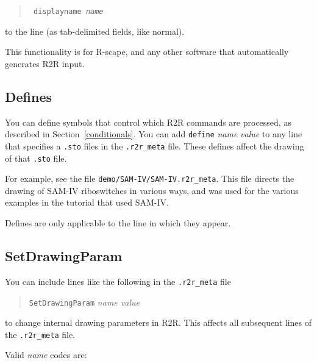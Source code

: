 \documentclass[letterpaper,12pt]{report}
\newcommand{\example}[1]{
\begin{quote}
{\raggedright
#1
}
\end{quote}
}
\newcommand{\examplett}[1]{
\example{{\tt #1}}
}
\begin{document}
\examplett{
  {\tt displayname} {\it name}
}

to the line (as tab-delimited fields, like normal).

This functionality is for R-scape, and any other software that automatically generates R2R input.

\subsection{Defines}

You can define symbols that control which R2R commands are processed, as described in Section~\ref{conditionals}.
You can add {\tt define} {\it name} {\it value} to any line that specifies a {\tt .sto} files in the {\tt .r2r\_meta} file.  These defines affect the drawing of that {\tt .sto} file.

For example, see the file {\tt demo/SAM-IV/SAM-IV.r2r\_meta}.  This file directs the drawing of SAM-IV riboswitches in various ways, and was used for the various examples in the tutorial that used SAM-IV.

Defines are only applicable to the line in which they appear.

\subsection{SetDrawingParam}
\label{SetDrawingParam}

You can include lines like the following in the {\tt .r2r\_meta} file
\example{
{\tt SetDrawingParam} \textit{ name  value}
}
to change internal drawing parameters in R2R.
This affects all subsequent lines of the {\tt .r2r\_meta} file.

Valid \textit{name} codes are:
\end{document}
